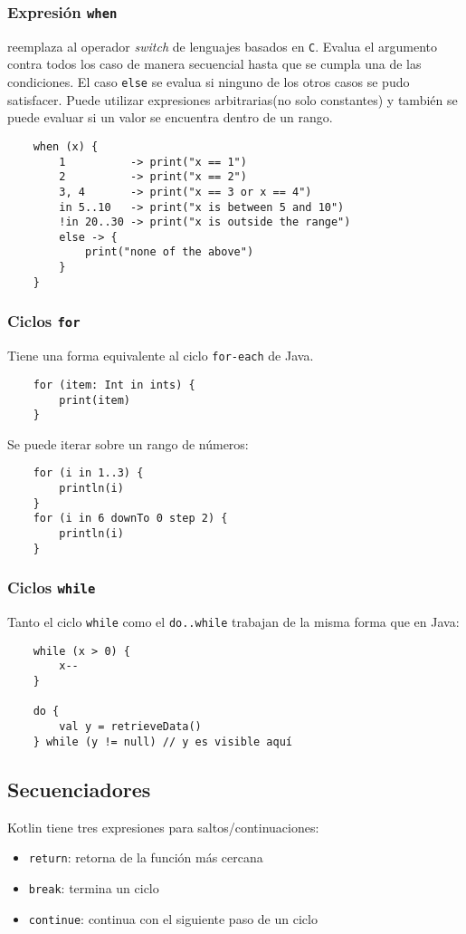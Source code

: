 \subsubsection{Expresión \texttt{when}}
reemplaza al operador \emph{switch} de lenguajes basados en \texttt{C}. Evalua el argumento contra todos los caso de manera secuencial hasta que se cumpla una de las condiciones. El caso \texttt{else} se evalua si ninguno de los otros casos se pudo satisfacer. Puede utilizar expresiones arbitrarias(no solo constantes) y también se puede evaluar si un valor se encuentra dentro de un rango.
\begin{verbatim}
    when (x) {
        1          -> print("x == 1")
        2          -> print("x == 2")
        3, 4       -> print("x == 3 or x == 4")
        in 5..10   -> print("x is between 5 and 10")
        !in 20..30 -> print("x is outside the range")
        else -> {
            print("none of the above")
        }
    }
\end{verbatim}

\subsubsection{Ciclos \texttt{for}} 
Tiene una forma equivalente al ciclo \texttt{for-each} de Java.
\begin{verbatim}
    for (item: Int in ints) {
        print(item)
    }
\end{verbatim}

Se puede iterar sobre un rango de números:
\begin{verbatim}
    for (i in 1..3) {
        println(i)
    }
    for (i in 6 downTo 0 step 2) {
        println(i)
    }
\end{verbatim}


\subsubsection{Ciclos \texttt{while}}
Tanto el ciclo \texttt{while} como el \texttt{do..while} trabajan de la misma forma que en Java:
\begin{verbatim}
    while (x > 0) {
        x--
    }
    
    do {
        val y = retrieveData()
    } while (y != null) // y es visible aquí
\end{verbatim}

\subsection{Secuenciadores}
Kotlin tiene tres expresiones para saltos/continuaciones:
\begin{itemize}
    \item \texttt{return}: retorna de la función más cercana
    \item \texttt{break}: termina un ciclo 
    \item \texttt{continue}: continua con el siguiente paso de un ciclo 
\end{itemize}

